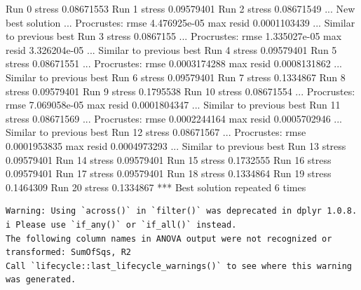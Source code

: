 \documentclass[
]{book}
\newenvironment{Shaded}{\begin{snugshade}}{\end{snugshade}}
\newcommand{\NormalTok}[1]{#1}
\begin{document}
\begin{Shaded}
\begin{Highlighting}[]
\NormalTok{Run 0 stress 0.08671553 }
\NormalTok{Run 1 stress 0.09579401 }
\NormalTok{Run 2 stress 0.08671549 }
\NormalTok{... New best solution}
\NormalTok{... Procrustes: rmse 4.476925e{-}05  max resid 0.0001103439 }
\NormalTok{... Similar to previous best}
\NormalTok{Run 3 stress 0.0867155 }
\NormalTok{... Procrustes: rmse 1.335027e{-}05  max resid 3.326204e{-}05 }
\NormalTok{... Similar to previous best}
\NormalTok{Run 4 stress 0.09579401 }
\NormalTok{Run 5 stress 0.08671551 }
\NormalTok{... Procrustes: rmse 0.0003174288  max resid 0.0008131862 }
\NormalTok{... Similar to previous best}
\NormalTok{Run 6 stress 0.09579401 }
\NormalTok{Run 7 stress 0.1334867 }
\NormalTok{Run 8 stress 0.09579401 }
\NormalTok{Run 9 stress 0.1795538 }
\NormalTok{Run 10 stress 0.08671554 }
\NormalTok{... Procrustes: rmse 7.069058e{-}05  max resid 0.0001804347 }
\NormalTok{... Similar to previous best}
\NormalTok{Run 11 stress 0.08671569 }
\NormalTok{... Procrustes: rmse 0.0002244164  max resid 0.0005702946 }
\NormalTok{... Similar to previous best}
\NormalTok{Run 12 stress 0.08671567 }
\NormalTok{... Procrustes: rmse 0.0001953835  max resid 0.0004973293 }
\NormalTok{... Similar to previous best}
\NormalTok{Run 13 stress 0.09579401 }
\NormalTok{Run 14 stress 0.09579401 }
\NormalTok{Run 15 stress 0.1732555 }
\NormalTok{Run 16 stress 0.09579401 }
\NormalTok{Run 17 stress 0.09579401 }
\NormalTok{Run 18 stress 0.1334864 }
\NormalTok{Run 19 stress 0.1464309 }
\NormalTok{Run 20 stress 0.1334867 }
\NormalTok{*** Best solution repeated 6 times}
\end{Highlighting}
\end{Shaded}

\begin{verbatim}
Warning: Using `across()` in `filter()` was deprecated in dplyr 1.0.8.
i Please use `if_any()` or `if_all()` instead.
The following column names in ANOVA output were not recognized or transformed: SumOfSqs, R2
Call `lifecycle::last_lifecycle_warnings()` to see where this warning was generated.
\end{verbatim}
\end{document}
